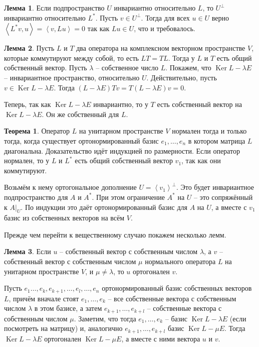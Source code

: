 \documentclass[10pt,a4paper,oneside]{book}
\theoremstyle{definition}
\newtheorem{thm}{Теорема}
\newtheorem{lem}{Лемма}
\DeclareMathOperator{\Ker}{Ker}
\def\lan{\left\langle }
\def\ran{\right\rangle}
\def\thrm{\begin{thm}}
\def\ethrm{\end{thm}}
\def\lm{\begin{lem}}
\def\elm{\end{lem}}
\begin{document}
\lm Если подпространство $U$ инвариантно относительно $L$, то $U^{\bot}$ инвариантно относительно $L^{*}$.
\proof Пусть $v\in U^{\bot}$. Тогда для всех $u\in U$ верно $\lan L^* v, u\ran = \lan v, Lu\ran =0 $ так как $Lu\in U$, что и требовалось.
\endproof
\elm

\lm Пусть $L$ и $T$ два оператора на комплексном векторном пространстве $V$, которые коммутируют между собой, то есть $LT=TL$. Тогда у $L$ и $T$ есть общий собственный вектор. 
\proof Пусть $\lambda$ -- собственное число $L$. Покажем, что $\Ker L -\lambda E$ -- инвариантное пространство, относительно $U$. Действительно, пусть $v\in \Ker L-\lambda E$. Тогда $(L-\lambda E)Tv=T(L-\lambda E)v=0$.

Теперь, так как $\Ker L-\lambda E$ инвариантно, то у $T$ есть собственный вектор на $\Ker L-\lambda E$. Он же собственный для $L$.
\endproof
\elm

\thrm 
Оператор $L$ на  унитарном пространстве $V$ нормален тогда и только тогда, когда существует ортонормированный базис $e_1,\dots,e_n$ в котором матрица $L$ диагональна.
\proof
Доказательство идёт индукцией по размерности. Если оператор нормален, то у $L$ и $L^*$ есть общий собственный вектор $v_1$, так как они коммутируют.

Возьмём к нему ортогональное дополнение $U=\lan v_1\ran^{\bot}$. Это будет инвариантное подпространство для $A$ и $A^*$. При этом ограничение $A^*$ на $U$ -- это сопряжённый к $A|_U$. По индукции это даёт ортонормированный базис для $A$ на $U$, а вместе с $v_1$ базис из собственных векторов на всём $V$.
\endproof
\ethrm


Прежде чем перейти к вещественному случаю покажем несколько лемм.

\lm Если $u$ -- собственный вектор с собственным числом $\lambda$, а $v$ -- собственный вектор с собственным числом $\mu$ нормального оператора $L$ на унитарном пространстве $V$, и $\mu\neq \lambda$, то $u$ ортогонален $v$. 
\elm
\proof Пусть $e_1\dots,e_k, e_{k+1},\dots,e_l, \dots,e_n$ ортонормированный базис собственных векторов $L$, причём вначале стоят  $e_1,\dots,e_k$ -- все собственные вектора с собственным числом $\lambda$ в этом базисе, а затем $e_{k+1},\dots,e_{k+l}$ -- собственные вектора с собственным числом $\mu$. Заметим, что тогда $e_1,\dots,e_k$ -- базис $\Ker L - \lambda E$ (если посмотреть на матрицу) и, аналогично $e_{k+1},\dots,e_{k+l}$ базис $\Ker L- \mu E$. Тогда  $\Ker L - \lambda E$ ортогонален $\Ker L- \mu E$, а вместе с ними вектора $u$ и $v$.
\endproof
\end{document}
